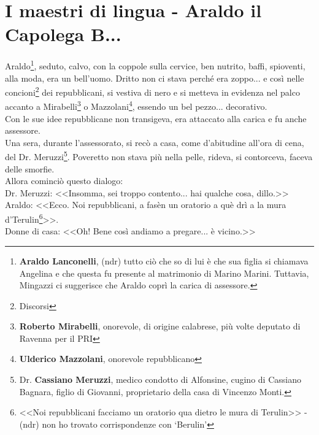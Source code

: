 
\chapter{I maestri di lingua - Araldo il Capolega B...}
Araldo\footnote{\textbf{Araldo Lanconelli}, (ndr) tutto ciò che so di lui è che sua figlia si chiamava Angelina e che questa fu presente al matrimonio di Marino Marini. Tuttavia, Mingazzi ci suggerisce che Araldo coprì la carica di assessore.}, seduto, calvo, con la coppole sulla cervice, ben nutrito, baffi, spioventi, alla moda, era un bell'uomo. Dritto non ci stava perché era zoppo... e così nelle concioni\footnote{Discorsi} dei repubblicani, si vestiva di nero e si metteva in evidenza nel palco accanto a Mirabelli\footnote{\textbf{Roberto Mirabelli}, onorevole, di origine calabrese, più volte deputato di Ravenna per il PRI} o Mazzolani\footnote{\textbf{Ulderico Mazzolani}, onorevole repubblicano}, essendo un bel pezzo... decorativo.\\
\indent Con le sue idee repubblicane non transigeva, era attaccato alla carica e fu anche assessore.\\
\indent Una sera, durante l'assessorato, si recò a casa, come d'abitudine all'ora di cena, del Dr. Meruzzi\footnote{Dr. \textbf{Cassiano Meruzzi}, medico condotto di Alfonsine, cugino di Cassiano Bagnara, figlio di Giovanni, proprietario della casa di Vincenzo Monti.}. Poveretto non stava più nella pelle, rideva, si contorceva, faceva delle smorfie.\\
\indent Allora cominciò questo dialogo:\\
\indent Dr. Meruzzi: <<Insomma, sei troppo contento... hai qualche cosa, dillo.>>\\
\indent {}Araldo: <<Ecco. Noi repubblicani, a fasèn un oratorio a què drì a la mura d'Terulin\footnote{<<Noi repubblicani facciamo un oratorio qua dietro le mura di Terulin>> - (ndr) non ho trovato corrispondenze con `Berulin'}>>.\\
\indent Donne di casa: <<Oh! Bene così andiamo a pregare... è vicino.>>\\
